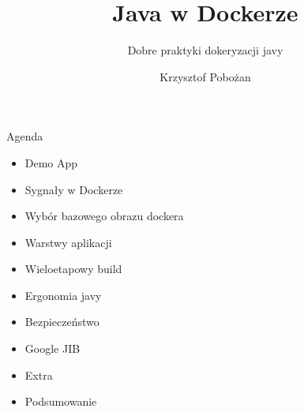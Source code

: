 \documentclass[epic,eepic,aspectratio=169,10pt]{beamer}
\begin{document}
    \title{Java w Dockerze}
    \subtitle{Dobre praktyki dokeryzacji javy}
    \author{Krzysztof Pobożan}
\begin{frame}
    \maketitle
\end{frame}
\begin{frame}{Agenda}
    \begin{itemize}
        \item Demo App
        \item Sygnały w Dockerze
        \item Wybór bazowego obrazu dockera
        \item Warstwy aplikacji
        \item Wieloetapowy build
        \item Ergonomia javy
        \item Bezpieczeństwo
        \item Google JIB
        \item Extra
        \item Podsumowanie
    \end{itemize}
\end{frame}
\end{document}
